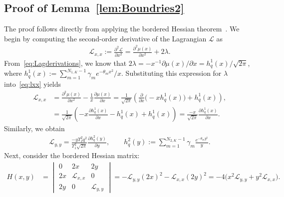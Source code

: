 \documentclass[journal,12pt,onecolumn,draftclsnofoot]{IEEEtran}
\theoremstyle{definition}
\begin{document}
\subsection{Proof of Lemma~\ref{lem:Boundries2}}\label{qp:Boundries2}
The proof follows directly from applying the bordered Hessian theorem~\cite{boothby2003introduction,d2001bordered}.  We begin by computing the second-order derivative of the Lagrangian $\mathcal{L}$ as
\begin{align}
    \label{eq:lxx}
    \mathcal{L}_{x,x} := \frac{\partial^2 \mathcal{L}}{\partial x^2} 
    = \frac{\partial^2 \mu(x)}{\partial x^2} + 2\lambda.
\end{align}
From~\eqref{eq:Lagderivations}, we know that $2\lambda = -{x}^{-1}{\partial \mu(x)}/{\partial x} = {h_q^{1}(x)}/{\sqrt{2\pi}}$,
where $h_q^{1}(x) := \sum_{m=1}^{N_{1,K}-1} \gamma_m {e^{-\theta_m x^2}}/x$. Substituting this expression for $\lambda$ into~\eqref{eq:lxx} yields
\begin{align}
\nonumber
    \mathcal{L}_{x,x} 
    &= \frac{\partial^2 \mu(x)}{\partial x^2} 
    - \frac{1}{x}\frac{\partial \mu(x)}{\partial x} 
    = \frac{1}{\sqrt{2\pi}} \left( \frac{\partial}{\partial x}\big(-x h_q^{1}(x)\big) + h_q^{1}(x) \right), \\
    &= \frac{1}{\sqrt{2\pi}} \left( -x\frac{\partial h_q^{1}(x)}{\partial x} - h_q^{1}(x) + h_q^{1}(x) \right)
    = \frac{-x}{\sqrt{2\pi}} \frac{\partial h_q^{1}(x)}{\partial x}.
    \label{eq:partialgq(x)}
\end{align}
Similarly, we obtain
\begin{align}
\nonumber
    \mathcal{L}_{y,y} 
    = \frac{-y\Upsilon_2^2 q^2}{\Upsilon_1^2 \sqrt{2\pi}} 
      \frac{\partial h_q^{2}(y)}{\partial y}, 
    \qquad 
    h_q^{2}(y) := \sum_{m=1}^{N_{2,K}-1} \gamma_m \frac{e^{-\theta_m y^2}}{y}.
\end{align}
Next, consider the bordered Hessian matrix:
\begin{align}
    H(x,y) 
    &= 
    \begin{vmatrix} 
        0 & 2x & 2y \\[3pt]
        2x &  \mathcal{L}_{x,x} & 0 \\[3pt]
        2y & 0 & \mathcal{L}_{y,y}
    \end{vmatrix}
    = -\mathcal{L}_{y,y}(2x)^2 - \mathcal{L}_{x,x}(2y)^2
    = -4\big(x^2 \mathcal{L}_{y,y} + y^2 \mathcal{L}_{x,x}\big).
    \label{eq:Hessian_matrix}
\end{align}
\end{document}
